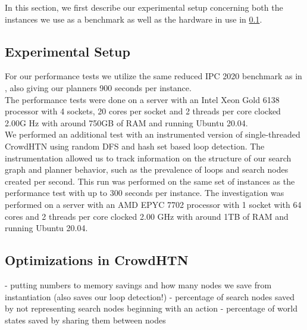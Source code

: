 In this section, we first describe our experimental setup concerning both the instances we use as a benchmark as well as the hardware in use in \ref{eval: setup}.

\subsection{Experimental Setup}
\label{eval: setup}
For our performance tests we utilize the same reduced IPC 2020 benchmark as in \cite{bretl2021parallel}, also giving our planners 900 seconds per instance. \\
The performance tests were done on a server with an Intel Xeon Gold 6138 processor with 4 sockets, 20 cores per socket and 2 threads per core clocked 2.00G Hz with around 750GB of RAM and running Ubuntu 20.04.\\
We performed an additional test with an instrumented version of single-threaded CrowdHTN using random DFS and hash set based loop detection. The instrumentation allowed us to track information on the structure of our search graph and planner behavior, such as the prevalence of loops and search nodes created per second. This run was performed on the same set of instances as the performance test with up to 300 seconds per instance. The investigation was performed on a server with an AMD EPYC 7702 processor with 1 socket with 64 cores and 2 threads per core clocked 2.00 GHz with around 1TB of RAM and running Ubuntu 20.04. \\

\subsection{Optimizations in CrowdHTN}
\label{eval: crowd optimizations}
- putting numbers to memory savings and how many nodes we save from instantiation (also saves our loop detection!)
- percentage of search nodes saved by not representing search nodes beginning with an action
- percentage of world states saved by sharing them between nodes

